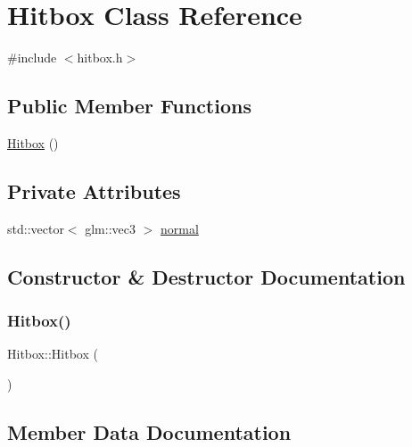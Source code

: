 \hypertarget{classHitbox}{}\section{Hitbox Class Reference}
\label{classHitbox}


{\ttfamily \#include $<$hitbox.\+h$>$}

\subsection*{Public Member Functions}
\begin{DoxyCompactItemize}
\item 
\hyperlink{classHitbox_a999b0be8486978b3dd7bcd001c7c3c03}{Hitbox} ()
\end{DoxyCompactItemize}
\subsection*{Private Attributes}
\begin{DoxyCompactItemize}
\item 
std\+::vector$<$ glm\+::vec3 $>$ \hyperlink{classHitbox_af424880af1cc55e9096f0758f948cae9}{normal}
\end{DoxyCompactItemize}


\subsection{Constructor \& Destructor Documentation}
\mbox{\label{classHitbox_a999b0be8486978b3dd7bcd001c7c3c03}} 
\subsubsection{\texorpdfstring{Hitbox()}{Hitbox()}}
{\footnotesize\ttfamily Hitbox\+::\+Hitbox (\begin{DoxyParamCaption}{ }\end{DoxyParamCaption})}



\subsection{Member Data Documentation}
\mbox{\label{classHitbox_af424880af1cc55e9096f0758f948cae9}} 
